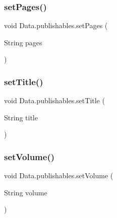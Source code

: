 \hypertarget{class_data_1_1publishables_a5f50216c1c3ec50ec46fb866ee3aa584}{}\label{class_data_1_1publishables_a5f50216c1c3ec50ec46fb866ee3aa584} 
\subsubsection{\texorpdfstring{set\+Pages()}{setPages()}}
{\footnotesize\ttfamily void Data.\+publishables.\+set\+Pages (\begin{DoxyParamCaption}\item[{String}]{pages }\end{DoxyParamCaption})}

\hypertarget{class_data_1_1publishables_a3d53c9a74e1dad13a2f12b7c4e521956}{}\label{class_data_1_1publishables_a3d53c9a74e1dad13a2f12b7c4e521956} 
\subsubsection{\texorpdfstring{set\+Title()}{setTitle()}}
{\footnotesize\ttfamily void Data.\+publishables.\+set\+Title (\begin{DoxyParamCaption}\item[{String}]{title }\end{DoxyParamCaption})}

\hypertarget{class_data_1_1publishables_ad75ef8fda848ce0c92bd3a0cffbb7cd5}{}\label{class_data_1_1publishables_ad75ef8fda848ce0c92bd3a0cffbb7cd5} 
\subsubsection{\texorpdfstring{set\+Volume()}{setVolume()}}
{\footnotesize\ttfamily void Data.\+publishables.\+set\+Volume (\begin{DoxyParamCaption}\item[{String}]{volume }\end{DoxyParamCaption})}

\hypertarget{class_data_1_1publishables_aa1ccf268dc89410fa9ab554470c66817}{}\label{class_data_1_1publishables_aa1ccf268dc89410fa9ab554470c66817} 
